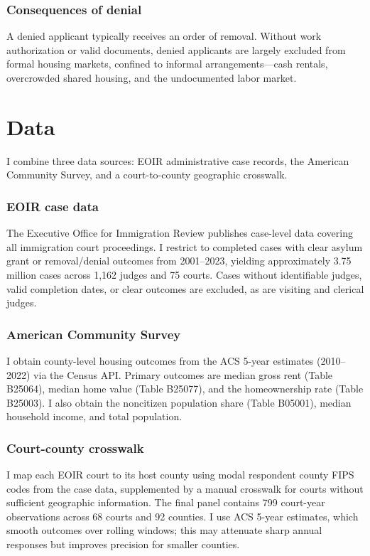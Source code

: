 \documentclass[12pt]{article}
\begin{document}
\subsubsection*{Consequences of denial} A denied applicant typically receives an order of removal. Without work authorization or valid documents, denied applicants are largely excluded from formal housing markets, confined to informal arrangements---cash rentals, overcrowded shared housing, and the undocumented labor market.


\section{Data}

I combine three data sources: EOIR administrative case records, the American Community Survey, and a court-to-county geographic crosswalk.

\subsubsection*{EOIR case data} The Executive Office for Immigration Review publishes case-level data covering all immigration court proceedings. I restrict to completed cases with clear asylum grant or removal/denial outcomes from 2001--2023, yielding approximately 3.75 million cases across 1,162 judges and 75 courts. Cases without identifiable judges, valid completion dates, or clear outcomes are excluded, as are visiting and clerical judges.

\subsubsection*{American Community Survey} I obtain county-level housing outcomes from the ACS 5-year estimates (2010--2022) via the Census API. Primary outcomes are median gross rent (Table B25064), median home value (Table B25077), and the homeownership rate (Table B25003). I also obtain the noncitizen population share (Table B05001), median household income, and total population.

\subsubsection*{Court-county crosswalk} I map each EOIR court to its host county using modal respondent county FIPS codes from the case data, supplemented by a manual crosswalk for courts without sufficient geographic information. The final panel contains 799 court-year observations across 68 courts and 92 counties. I use ACS 5-year estimates, which smooth outcomes over rolling windows; this may attenuate sharp annual responses but improves precision for smaller counties.
\end{document}
